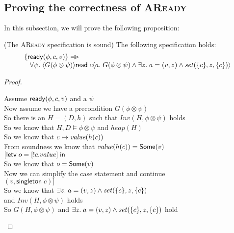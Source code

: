 \subsection{Proving the correctness of \textsc{AReady}}

In this subsection, we will prove the following proposition: 

\begin{prop*}{(The \textsc{AReady} specification is sound)}
The following specification holds: 
\begin{displaymath}
\begin{array}{l}
\{{\mathsf{ready}({\phi}, {c}, {v})}\} \Rightarrow\!\!\!> \\
\;\;\;\forall \psi.\; \langle{G(\phi \otimes \psi)}\rangle{\mathsf{read}\;c}\langle{a}.\;{G(\phi \otimes \psi) \land \exists z.\;a = (v, z) \land \mathit{set}(\{{c}\}, z, \{{c}\})}\rangle 
\end{array}
\end{displaymath}
\end{prop*}

\begin{proof}
\begin{tabbedproof}
\oo Assume $\mathsf{ready}({\phi}, {c}, {v})$ and a $\psi$ \\
\ooo Now assume we have a precondition $G(\phi \otimes \psi)$ \\
\ooo So there is an $H = (D,h)$ such that $\mathit{Inv}(H, \phi \otimes \psi)$ holds \\
\ooo So we know that $H, D \models \phi \otimes \psi$ and $\mathit{heap}(H)$ \\
\ooo So we know that $c \mapsto \mathit{value}(h(c))$ \\
\ooo From soundness we know that $\mathit{value}(h(c)) = \mathsf{Some}(v)$ \\
\ooo $[\mathsf{letv}\;o = [!c.value]\;\mathsf{in}\;$ \\
\ooo So we know that $o = \mathsf{Some}(v)$ \\
\ooo Now we can simplify the case statement and continue \\
\ooo $(v, \mathsf{singleton}\;c)]$ \\
\ooo So we know that $\exists z.\;a = (v, z) \land \mathit{set}(\{{c}\}, z, \{{c}\})$ \\
\oox and $\mathit{Inv}(H, \phi \otimes \psi)$ holds \\
\ooo So $G(H, \phi \otimes \psi)$ and $\exists z.\;a = (v, z) \land \mathit{set}(\{{c}\}, z, \{{c}\})$ hold
\end{tabbedproof}
\end{proof}

